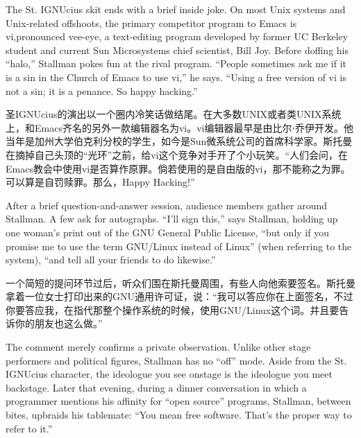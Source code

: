 \ifdefined\eng
The St. IGNUcius skit ends with a brief inside joke. On most Unix systems and Unix-related offshoots, the primary competitor program to Emacs is vi,\ifdefined\vtwo pronounced vee-eye, \fi a text-editing program developed by former UC Berkeley student and current Sun Microsystems chief scientist, Bill Joy. Before doffing his ``halo,'' Stallman pokes fun at the rival program. ``People sometimes ask me if it is a sin in the Church of Emacs to use vi,'' he says. ``Using a free version of vi is not a sin; it is a penance. So happy hacking.''\ifdefined\vtwo{}\fi
\fi

\ifdefined\chs
圣IGNUcius的演出以一个圈内冷笑话做结尾。在大多数UNIX或者类UNIX系统上，和Emacs齐名的另外一款编辑器名为vi。vi编辑器最早是由比尔⋅乔伊开发。他当年是加州大学伯克利分校的学生，如今是Sun微系统公司的首席科学家。斯托曼在摘掉自己头顶的``光环''之前，给vi这个竞争对手开了个小玩笑。``人们会问，在Emacs教会中使用vi是否算作原罪。倘若使用的是自由版的vi，那不能称之为罪。可以算是自罚赎罪。那么，Happy Hacking\ifdefined\vtwo{}\fi!''
\fi

\ifdefined\eng
After a brief question-and-answer session, audience members gather around Stallman. A few ask for autographs. ``I'll sign this,'' says Stallman, holding up one woman's print out of the GNU General Public License, ``but only if you promise me to use the term GNU/Linux instead of Linux\ifdefined\vtwo '' (when referring to the system), ``\fi and tell all your friends to do likewise.''
\fi

\ifdefined\chs
一个简短的提问环节过后，听众们围在斯托曼周围，有些人向他索要签名。斯托曼拿着一位女士打印出来的GNU通用许可证，说：``我可以答应你在上面签名，不过你要答应我，在指代那整个操作系统的时候，使用GNU/Linux这个词。并且要告诉你的朋友也这么做。''
\fi

\ifdefined\eng
The comment merely confirms a private observation. Unlike other stage performers and political figures, Stallman has no ``off'' mode. Aside from the St. IGNUcius character, the ideologue you see onstage is the ideologue you meet backstage. Later that evening, during a dinner conversation in which a programmer mentions his affinity for ``open source'' programs, Stallman, between bites, upbraids his tablemate: ``You mean free software. That's the proper way to refer to it.''
\fi

